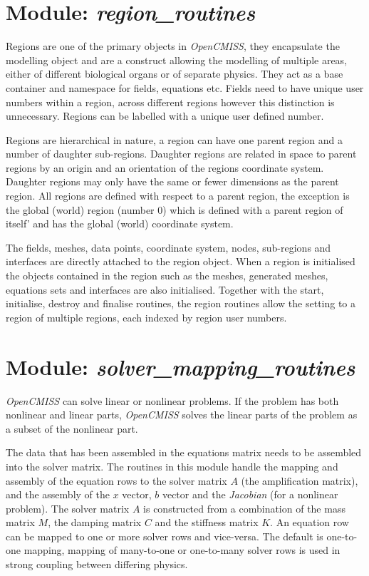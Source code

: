 \section{Module: \emph{region\_routines}}
\label{sec:regionroutines}

Regions are one of the primary objects in \emph{OpenCMISS}, they encapsulate 
the modelling object and are a construct allowing the modelling of multiple 
areas, either of different biological organs or of separate physics. They act 
as a base container and namespace for fields, equations etc. Fields need to 
have unique user numbers within a region, across different regions however 
this distinction is unnecessary. Regions can be labelled with a unique user 
defined number. 

Regions are hierarchical in nature, a region can have one parent region and a 
number of daughter sub-regions. Daughter regions are related in space to 
parent regions by an origin and an orientation of the regions coordinate 
system. Daughter regions may only have the same or fewer dimensions as the 
parent region. All regions are defined with respect to a parent region, the 
exception is the global (world) region (number $0$) which is defined with a
parent region of itself' and has the global (world) coordinate system.
  
The fields, meshes, data points, coordinate system, nodes, sub-regions and 
interfaces are directly attached to the region object. When a region is 
initialised the objects contained in the region such as the meshes, generated 
meshes, equations sets and interfaces are also initialised. Together with the 
start, initialise, destroy and finalise routines, the region routines allow 
the setting to a region of multiple regions, each indexed by region user 
numbers.


\section{Module: \emph{solver\_mapping\_routines}}
\label{sec:solvermappingroutines}

\emph{OpenCMISS} can solve linear or nonlinear problems. If the problem has 
both nonlinear and linear parts, \emph{OpenCMISS} solves the linear parts 
of the problem as a subset of the nonlinear part.

The data that has been assembled in the equations matrix needs to be assembled 
into the solver matrix. The routines in this module handle the mapping and 
assembly of the equation rows to the solver matrix $A$ (the amplification 
matrix), and the assembly of the $x$ vector, $b$ vector and the \emph{Jacobian} 
(for a nonlinear problem). The solver matrix $A$ is constructed from a 
combination of the mass matrix $M$, the damping matrix $C$ and the stiffness 
matrix $K$. An equation row can be mapped to one or more solver rows and 
vice-versa. The default is one-to-one mapping, mapping of many-to-one or 
one-to-many solver rows is used in strong coupling between differing physics.

